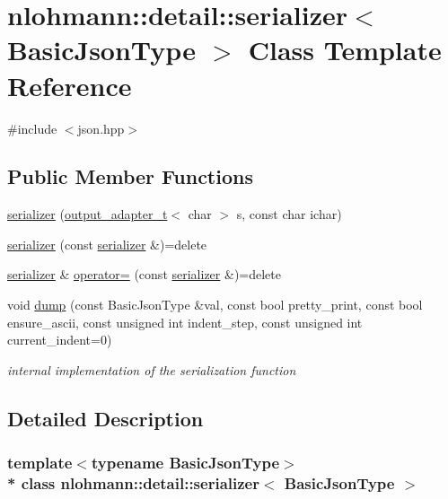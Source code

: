 \hypertarget{classnlohmann_1_1detail_1_1serializer}{}\section{nlohmann\+:\+:detail\+:\+:serializer$<$ Basic\+Json\+Type $>$ Class Template Reference}
\label{classnlohmann_1_1detail_1_1serializer}


{\ttfamily \#include $<$json.\+hpp$>$}

\subsection*{Public Member Functions}
\begin{DoxyCompactItemize}
\item 
\hyperlink{classnlohmann_1_1detail_1_1serializer_a3076c4514179654cc81d17048439c24a}{serializer} (\hyperlink{namespacenlohmann_1_1detail_a0fd8edff7729aa2dd92b070964bade2e}{output\+\_\+adapter\+\_\+t}$<$ char $>$ s, const char ichar)
\item 
\hyperlink{classnlohmann_1_1detail_1_1serializer_ae3771351ec4cb892bec707edeb56dc31}{serializer} (const \hyperlink{classnlohmann_1_1detail_1_1serializer}{serializer} \&)=delete
\item 
\hyperlink{classnlohmann_1_1detail_1_1serializer}{serializer} \& \hyperlink{classnlohmann_1_1detail_1_1serializer_a5f14c33012477b9f9876dc54d97009a0}{operator=} (const \hyperlink{classnlohmann_1_1detail_1_1serializer}{serializer} \&)=delete
\item 
void \hyperlink{classnlohmann_1_1detail_1_1serializer_a95460ebd1a535a543e5a0ec52e00f48b}{dump} (const Basic\+Json\+Type \&val, const bool pretty\+\_\+print, const bool ensure\+\_\+ascii, const unsigned int indent\+\_\+step, const unsigned int current\+\_\+indent=0)
\begin{DoxyCompactList}\small\item\em internal implementation of the serialization function \end{DoxyCompactList}\end{DoxyCompactItemize}


\subsection{Detailed Description}
\subsubsection*{template$<$typename Basic\+Json\+Type$>$\\*
class nlohmann\+::detail\+::serializer$<$ Basic\+Json\+Type $>$}



